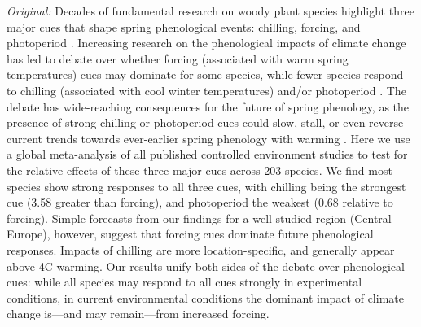 \documentclass{article}
\begin{document}
\emph{Original:} Decades of fundamental research on woody plant species highlight three major cues that shape spring phenological events: chilling, forcing, and photoperiod \citep[e.g.,][]{Campbell:1975aa,Heide:2008aa,flynn2018}. Increasing research on the phenological impacts of climate change has led to debate over whether forcing (associated with warm spring temperatures) cues may dominate for some species, while fewer species
respond to chilling (associated with cool winter temperatures) and/or photoperiod \citep{Heide:2011aa,koerner2010b,zohner2016}. The debate has wide-reaching consequences for the future of spring phenology, as the presence of strong chilling or photoperiod cues could slow, stall, or even reverse current trends towards ever-earlier spring phenology with warming \citep{fu2015,koerner2010a}. Here we use a global meta-analysis of all published controlled environment studies to test for the relative effects of these three major cues across 203 species. We find most species show strong responses to all three cues, with chilling being the strongest cue (3.58 greater than forcing), and photoperiod the weakest (0.68 relative to forcing). Simple forecasts from our findings for a well-studied region (Central Europe), however, suggest that forcing cues dominate future phenological responses. Impacts of chilling are more location-specific, and generally appear above 4\degree C warming. Our results unify both sides of the debate over phenological cues: while all species may respond to all cues strongly in experimental conditions, in current environmental conditions the dominant impact of climate change is---and may remain---from increased forcing. 
\end{document}

